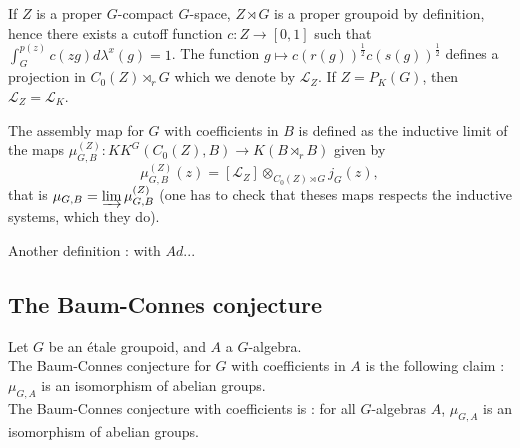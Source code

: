 If $Z$ is a proper $G$-compact $G$-space, $Z\rtimes G$ is a proper groupoid by definition, hence there exists a cutoff function $c : Z\rightarrow [0,1]$ such that $\int_G^{p(z)} c(zg)d\lambda^x(g) = 1$. The function $g\mapsto c(r(g))^{\frac{1}{2}}c(s(g))^{\frac{1}{2}} $ defines a projection in $C_0(Z)\rtimes_r G$ which we denote by $\mathcal L_Z$. If $Z=P_K(G)$, then $\mathcal L_Z = \mathcal L_K$.

\begin{definition}
The assembly map for $G$ with coefficients in $B$ is defined as the inductive limit of the maps $\mu_{G,B}^{(Z)} : KK^G(C_0(Z),B)\rightarrow K(B\rtimes_r B)$ given by
\[\mu_{G,B}^{(Z)} (z)=[\mathcal L_Z]\otimes_{C_0(Z)\rtimes G} j_G(z),\]
that is $\mu_{G,B} = \varinjlim \mu_{G,B}^{(Z)}$ (one has to check that theses maps respects the inductive systems, which they do).
\end{definition}

Another definition : with $Ad$...

\subsection{The Baum-Connes conjecture}

\begin{conjecture}
Let $G$ be an étale groupoid, and $A$ a $G$-algebra.\\
The Baum-Connes conjecture for $G$ with coefficients in $A$ is the following claim : $\mu_{G,A}$ is an isomorphism of abelian groups.\\
The Baum-Connes conjecture with coefficients is : for all $G$-algebras $A$, $\mu_{G,A}$ is an isomorphism of abelian groups.
\end{conjecture}



























